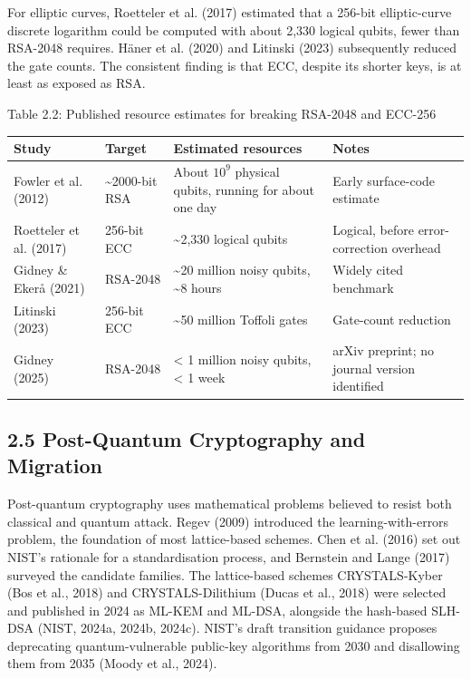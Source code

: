\documentclass[12pt,oneside]{report}
\begin{document}
For elliptic curves, Roetteler et al. (2017) estimated that a 256-bit elliptic-curve discrete logarithm could be computed with about 2,330 logical qubits, fewer than RSA-2048 requires. Häner et al. (2020) and Litinski (2023) subsequently reduced the gate counts. The consistent finding is that ECC, despite its shorter keys, is at least as exposed as RSA.
\par

\label{tab:2.2}Table 2.2: Published resource estimates for breaking RSA-2048 and ECC-256
\par

\begin{center}\small\begin{tabularx}{\textwidth}{|W|W|W|W|}\hline
Study & Target & Estimated resources & Notes \\\hline
Fowler et al. (2012) & \textasciitilde{}2000-bit RSA & About $10^{9}$ physical qubits, running for about one day & Early surface-code estimate \\\hline
Roetteler et al. (2017) & 256-bit ECC & \textasciitilde{}2,330 logical qubits & Logical, before error-correction overhead \\\hline
Gidney \& Ekerå (2021) & RSA-2048 & \textasciitilde{}20 million noisy qubits, \textasciitilde{}8 hours & Widely cited benchmark \\\hline
Litinski (2023) & 256-bit ECC & \textasciitilde{}50 million Toffoli gates & Gate-count reduction \\\hline
Gidney (2025) & RSA-2048 & < 1 million noisy qubits, < 1 week & arXiv preprint; no journal version identified \\\hline\end{tabularx}\end{center}

\subsection*{2.5 Post-Quantum Cryptography and Migration}

Post-quantum cryptography uses mathematical problems believed to resist both classical and quantum attack. Regev (2009) introduced the learning-with-errors problem, the foundation of most lattice-based schemes. Chen et al. (2016) set out NIST's rationale for a standardisation process, and Bernstein and Lange (2017) surveyed the candidate families. The lattice-based schemes CRYSTALS-Kyber (Bos et al., 2018) and CRYSTALS-Dilithium (Ducas et al., 2018) were selected and published in 2024 as ML-KEM and ML-DSA, alongside the hash-based SLH-DSA (NIST, 2024a, 2024b, 2024c). NIST's draft transition guidance proposes deprecating quantum-vulnerable public-key algorithms from 2030 and disallowing them from 2035 (Moody et al., 2024).
\par
\end{document}
